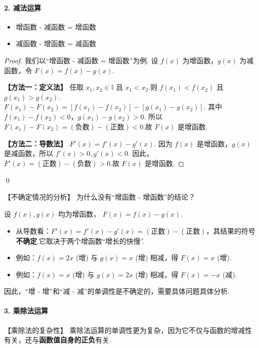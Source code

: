 \paragraph{2. 减法运算}
\begin{theorem}[减法律]
	\begin{itemize}
		\item 增函数 - 减函数 = 增函数
		\item 减函数 - 增函数 = 减函数
	\end{itemize}
\end{theorem}
\begin{proof}
	我们以“增函数 - 减函数 = 增函数”为例.
	设 $f(x)$ 为增函数，$g(x)$ 为减函数，令 $F(x) = f(x) - g(x)$.
	
	\textbf{【方法一：定义法】}
	任取 $x_1, x_2 \in \mathbb{I}$ 且 $x_1 < x_2$.则 $f(x_1) < f(x_2)$ 且 $g(x_1) > g(x_2)$.
	$F(x_1) - F(x_2) = [f(x_1)-f(x_2)] - [g(x_1)-g(x_2)]$.
	其中 $f(x_1)-f(x_2) < 0$，$g(x_1)-g(x_2) > 0$.
	所以 $F(x_1)-F(x_2) = (\text{负数}) - (\text{正数}) < 0$.故 $F(x)$ 是增函数.
	
	\textbf{【方法二：导数法】}
	$F'(x) = f'(x) - g'(x)$.
	因为 $f(x)$ 是增函数，$g(x)$ 是减函数，所以 $f'(x)>0, g'(x)<0$.
	因此，$F'(x) = (\text{正数}) - (\text{负数}) > 0$.故 $F(x)$ 是增函数.
\end{proof}
\qed

【不确定情况的分析】
为什么没有“增函数 - 增函数”的结论？
	
设 $f(x), g(x)$ 均为增函数， $F(x) = f(x)-g(x)$.
	\begin{itemize}
		\item 从导数看：$F'(x)=f'(x)-g'(x) = (\text{正数}) - (\text{正数})$，其结果的符号\textbf{不确定}.它取决于两个增函数“增长的快慢”.
		\item 例如：$f(x)=2x$ (增) 与 $g(x)=x$ (增) 相减，得 $F(x)=x$ (增).
		\item 例如：$f(x)=x$ (增) 与 $g(x)=2x$ (增) 相减，得 $F(x)=-x$ (减).
\end{itemize}
因此，“增 - 增”和“减 - 减”的单调性是不确定的，需要具体问题具体分析.


\paragraph{3. 乘除法运算}
【乘除法的复杂性】
乘除法运算的单调性更为复杂，因为它不仅与函数的增减性有关，还与\textbf{函数值自身的正负}有关.


